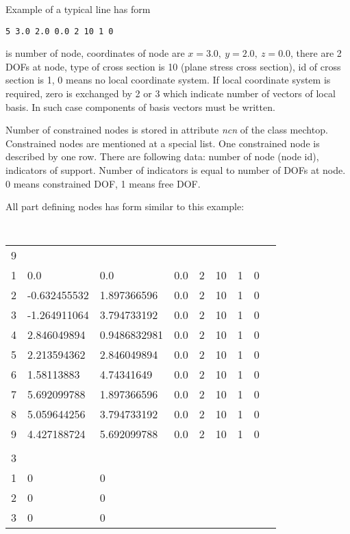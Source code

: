 Example of a typical line has form

\noindent
{\tt 5  3.0 2.0 0.0   2  10 1  0}

 is number of node, coordinates of node are $x=3.0,\ y=2.0,\ z=0.0$, there are 2 DOFs at node, type of
cross section is 10 (plane stress cross section), id of cross section is 1, 0 means no local coordinate
system. If local coordinate system is required, zero is exchanged by 2 or 3 which indicate number of vectors
of local basis. In such case components of basis vectors must be written.

Number of constrained nodes is stored in attribute {\it ncn} of the class {\sf mechtop}.
Constrained nodes are mentioned at a special list. One constrained node is described by one row.
There are following data: number of node (node id), indicators of support. Number of indicators
is equal to number of DOFs at node. 0 means constrained DOF, 1 means free DOF.

All part defining nodes has form similar to this example:

\begin{center}
{\tt
\begin{tabular}{lllllllll}
9 &              &              &     &   &    &   &
\\
1 & 0.0          & 0.0          & 0.0 & 2 & 10 & 1 & 0
\\
2 & -0.632455532 & 1.897366596  & 0.0 & 2 & 10 & 1 & 0
\\
3 &-1.264911064  & 3.794733192  & 0.0 & 2 & 10 & 1 & 0
\\
4 & 2.846049894  & 0.9486832981 & 0.0 & 2 & 10 & 1 & 0
\\
5 & 2.213594362  & 2.846049894  & 0.0 & 2 & 10 & 1 & 0
\\
6 & 1.58113883   & 4.74341649   & 0.0 & 2 & 10 & 1 & 0
\\
7 & 5.692099788  & 1.897366596  & 0.0 & 2 & 10 & 1 & 0
\\
8 & 5.059644256  & 3.794733192  & 0.0 & 2 & 10 & 1 & 0
\\
9 & 4.427188724  & 5.692099788  & 0.0 & 2 & 10 & 1 & 0
\\
\\
3 &              &              &     &   &    &   &
\\
1 & 0            & 0            &     &   &    &   &
\\
2 & 0            & 0            &     &   &    &   &
\\
3 & 0            & 0            &     &   &    &   &
\\
\end{tabular}
}
\end{center}

